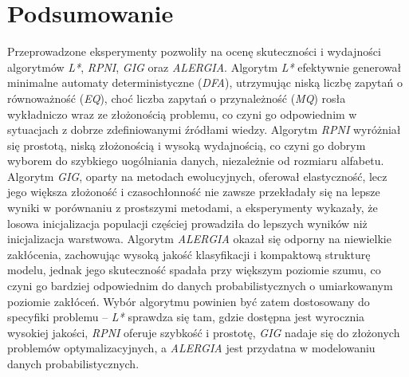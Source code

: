 \section{Podsumowanie}  
Przeprowadzone eksperymenty pozwoliły na ocenę skuteczności i wydajności algorytmów \textit{L*}, \textit{RPNI}, \textit{GIG} oraz \textit{ALERGIA}. Algorytm \textit{L*} efektywnie generował minimalne automaty deterministyczne (\textit{DFA}), utrzymując niską liczbę zapytań o równoważność (\textit{EQ}), choć liczba zapytań o przynależność (\textit{MQ}) rosła wykładniczo wraz ze złożonością problemu, co czyni go odpowiednim w sytuacjach z dobrze zdefiniowanymi źródłami wiedzy. Algorytm \textit{RPNI} wyróżniał się prostotą, niską złożonością i wysoką wydajnością, co czyni go dobrym wyborem do szybkiego uogólniania danych, niezależnie od rozmiaru alfabetu. Algorytm \textit{GIG}, oparty na metodach ewolucyjnych, oferował elastyczność, lecz jego większa złożoność i czasochłonność nie zawsze przekładały się na lepsze wyniki w porównaniu z prostszymi metodami, a eksperymenty wykazały, że losowa inicjalizacja populacji częściej prowadziła do lepszych wyników niż inicjalizacja warstwowa. Algorytm \textit{ALERGIA} okazał się odporny na niewielkie zakłócenia, zachowując wysoką jakość klasyfikacji i kompaktową strukturę modelu, jednak jego skuteczność spadała przy większym poziomie szumu, co czyni go bardziej odpowiednim do danych probabilistycznych o umiarkowanym poziomie zakłóceń. Wybór algorytmu powinien być zatem dostosowany do specyfiki problemu – \textit{L*} sprawdza się tam, gdzie dostępna jest wyrocznia wysokiej jakości, \textit{RPNI} oferuje szybkość i prostotę, \textit{GIG} nadaje się do złożonych problemów optymalizacyjnych, a \textit{ALERGIA} jest przydatna w modelowaniu danych probabilistycznych.
